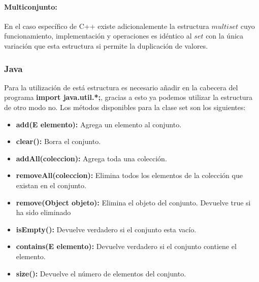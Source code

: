\paragraph{Multiconjunto:}En el caso específico de C++ existe adicionalemente la estructura $multiset$ cuyo funcionamiento, implementación y operaciones es idéntico al $set$ con la única variación que esta estructura si permite la duplicación de valores. 

\subsubsection{Java}

Para la utilización de está estructura es necesario añadir en la cabecera del programa \textbf{import java.util.*;}, gracias a esto ya podemos utilizar la estructura de otro modo no. Los métodos disponibles para la clase set son los siguientes:

\begin{itemize}
	\item \textbf{add(E elemento):} Agrega un elemento al conjunto.
	\item \textbf{clear():} Borra el conjunto.
	\item \textbf{addAll(coleccion):} Agrega toda una colección.
	\item \textbf{removeAll(coleccion):} Elimina todos los elementos de la
colección que existan en el conjunto.
	\item \textbf{remove(Object objeto):} Elimina el objeto del conjunto. Devuelve true si ha sido eliminado
	\item \textbf{isEmpty():} Devuelve verdadero si el conjunto esta vacío.
	\item \textbf{contains(E elemento):} Devuelve verdadero si el conjunto contiene el elemento.
	\item \textbf{size():} Devuelve el número de elementos del
conjunto.
\end{itemize}

